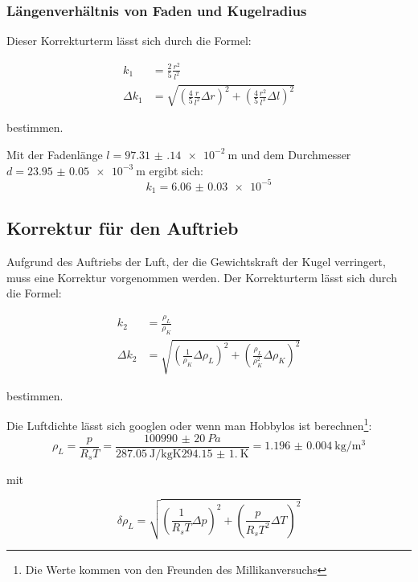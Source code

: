 \documentclass[12pt,a4paper,titlepage]{scrartcl}
\numberwithin{equation}{section}
\numberwithin{table}{section}
\numberwithin{figure}{section}
\begin{document}
\subsubsection{Längenverhältnis von Faden und Kugelradius}

Dieser Korrekturterm lässt sich durch die Formel:

\begin{align}
    k_1 &= \frac{2}{5}\frac{r^2}{l^2}\\
    \Delta k_1 &= \sqrt{\left(\frac{4}{5}\frac{r}{l^2}\Delta r\right)^2 + \left(\frac{4}{5}\frac{r^2}{l^3}\Delta l\right)^2}
\end{align}

bestimmen. 

Mit der Fadenlänge $l = \qty{97.31(14)e-2}{\meter}$ und dem Durchmesser $d = \qty{23.95(5)e-3}{\meter}$ ergibt sich:
\begin{equation}
    k_1 = \num{6.06(3)e-5}
\end{equation}

\subsection{Korrektur für den Auftrieb}
Aufgrund des Auftriebs der Luft, der die Gewichtskraft der Kugel verringert, muss eine Korrektur vorgenommen werden. Der Korrekturterm lässt sich durch die Formel:

\begin{align}
    k_2 &= \frac{\rho_L}{\rho_K}\\
    \Delta k_2 &= \sqrt{\left(\frac{1}{\rho_K}\Delta \rho_L\right)^2 + \left(\frac{\rho_L}{\rho_K^2}\Delta \rho_K\right)^2}
\end{align}

bestimmen.

Die Luftdichte lässt sich googlen oder wenn man Hobbylos ist berechnen\footnote{Die Werte kommen von den Freunden des Millikanversuchs}:
\begin{equation}
    \rho_L = \frac{p}{R_s T} = \frac{\qty{100990(20)}{Pa}}{\qty{287.05}{\joule\per\kilo\gram\kelvin}  \qty{294.15(1.00)}{\kelvin} } = \qty{1.196(4)}{\kilo\gram\per\meter\cubed}
\end{equation}

mit 

\begin{equation}
    \delta \rho_L = \sqrt{\left(\frac{1}{R_sT}\Delta p\right)^2 + \left(\frac{p}{R_sT^2}\Delta T\right)^2}
\end{equation}
\end{document}

